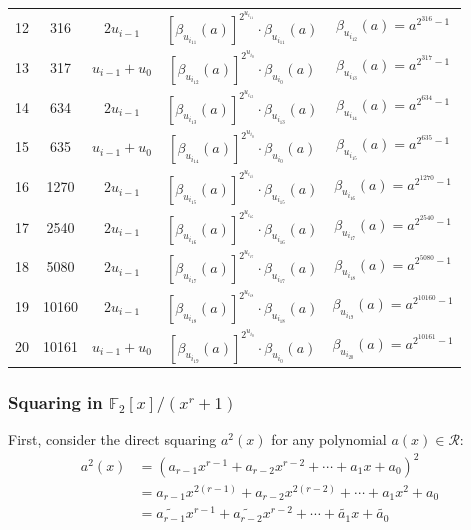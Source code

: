 \documentclass[runningheads]{llncs}
\begin{document}
\begin{table}[!tb]
\begin{tabular}{ccccc}
  12  & 316  & $2u_{i-1}$ &$[\beta_{u_{i_{11}}}(a)]^{2^{u_{i_{11}}}}\cdot \beta_{u_{i_{11}}}(a)$ & $\beta_{u_{i_{12}}}(a)=a^{2^{316}-1}$\\
  13  & 317  & $u_{i-1}+u_0$   &$[\beta_{u_{i_{12}}}(a)]^{2^{u_{i_0}}}\cdot \beta_{u_{i_0}}(a)$ & $\beta_{u_{i_{13}}}(a)=a^{2^{317}-1}$\\
  14  & 634  & $2u_{i-1}$ &$[\beta_{u_{i_{13}}}(a)]^{2^{u_{i_{13}}}}\cdot \beta_{u_{i_{13}}}(a)$ & $\beta_{u_{i_{14}}}(a)=a^{2^{634}-1}$\\
  15  & 635  & $u_{i-1}+u_0$   &$[\beta_{u_{i_{14}}}(a)]^{2^{u_{i_0}}}\cdot \beta_{u_{i_0}}(a)$ & $\beta_{u_{i_{15}}}(a)=a^{2^{635}-1}$\\
  16  & 1270  & $2u_{i-1}$ &$[\beta_{u_{i_{15}}}(a)]^{2^{u_{i_{15}}}}\cdot \beta_{u_{i_{15}}}(a)$ & $\beta_{u_{i_{16}}}(a)=a^{2^{1270}-1}$\\
  17  & 2540  & $2u_{i-1}$ &$[\beta_{u_{i_{16}}}(a)]^{2^{u_{i_{16}}}}\cdot \beta_{u_{i_{16}}}(a)$ & $\beta_{u_{i_{17}}}(a)=a^{2^{2540}-1}$\\
  18  & 5080  & $2u_{i-1}$ &$[\beta_{u_{i_{17}}}(a)]^{2^{u_{i_{17}}}}\cdot \beta_{u_{i_{17}}}(a)$ & $\beta_{u_{i_{18}}}(a)=a^{2^{5080}-1}$\\
  19  & 10160 & $2u_{i-1}$ &$[\beta_{u_{i_{18}}}(a)]^{2^{u_{i_{18}}}}\cdot \beta_{u_{i_{18}}}(a)$ & $\beta_{u_{i_{19}}}(a)=a^{2^{10160}-1}$\\
  20  & 10161 & $u_{i-1}+u_0$ &$[\beta_{u_{i_{19}}}(a)]^{2^{u_{i_{0}}}}\cdot \beta_{u_{i_{0}}}(a)$ & $\beta_{u_{i_{20}}}(a)=a^{2^{10161}-1}$\\
  \hline
\end{tabular}
\end{table}


\subsubsection{Squaring in $\mathbb{F}_2[x]/(x^r+1)$}

First, consider the direct squaring $a^2(x)$ for any polynomial $a(x)\in \mathcal{R}$:
\begin{align}
    a^2(x) &= (a_{r-1}x^{r-1}+a_{r-2}x^{r-2}+\cdots + a_{1}x + a_0)^2\\
    &= a_{r-1}x^{2(r-1)}+a_{r-2}x^{2(r-2)}+\cdots + a_1x^2 + a_0\\
    &= \widetilde{a_{r-1}}x^{r-1}+\widetilde{a_{r-2}}x^{r-2}+\cdots + \widetilde{a_{1}}x +\widetilde{a_0}
\end{align}
\end{document}

